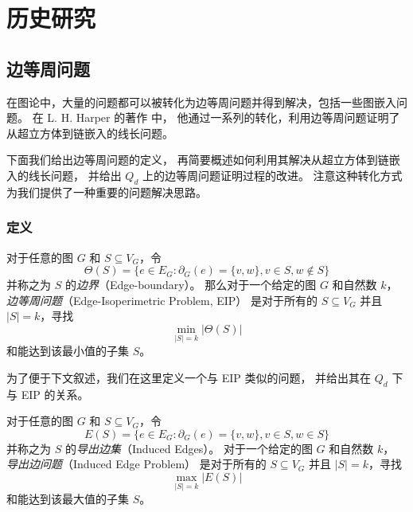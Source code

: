 
\chapter{历史研究}
\label{Chapter 3}

\section{边等周问题}
\label{Section 3.1}

在图论中，大量的问题都可以被转化为边等周问题并得到解决，包括一些图嵌入问题。
在 L. H. Harper 的著作 \cite{Harper.1964,Harper.2004} 中，
他通过一系列的转化，利用边等周问题证明了从超立方体到链嵌入的线长问题。

下面我们给出边等周问题的定义，
再简要概述如何利用其解决从超立方体到链嵌入的线长问题，
并给出 $Q_d$ 上的边等周问题证明过程的改进。
注意这种转化方式为我们提供了一种重要的问题解决思路。

\subsection{定义}
\label{Subsection 3.1.1}

对于任意的图 $G$ 和 $S \subseteq V_G$，令
\begin{equation*}
\Theta(S) = \{e \in E_G \colon \partial_G(e) = \{v, w\}, v \in S, w \notin S\}
\end{equation*}
并称之为 $S$ 的\emph{边界}（Edge-boundary）。
那么对于一个给定的图 $G$ 和自然数 $k$，
\emph{边等周问题}（Edge-Isoperimetric Problem, EIP）
是对于所有的 $S \subseteq V_G$ 并且 $|S| = k$，寻找
\begin{equation*}
\min_{|S| = k} |\Theta(S)|
\end{equation*}
和能达到该最小值的子集 $S$。

为了便于下文叙述，我们在这里定义一个与 EIP 类似的问题，
并给出其在 $Q_d$ 下与 EIP 的关系。

对于任意的图 $G$ 和 $S \subseteq V_G$，令
\begin{equation*}
E(S) = \{e \in E_G \colon \partial_G(e) = \{v, w\}, v \in S, w \in S\}
\end{equation*}
并称之为 $S$ 的\emph{导出边集}（Induced Edges）。
对于一个给定的图 $G$ 和自然数 $k$，
\emph{导出边问题}（Induced Edge Problem）
是对于所有的 $S \subseteq V_G$ 并且 $|S| = k$，寻找
\begin{equation*}
\max_{|S| = k} |E(S)|
\end{equation*}
和能达到该最大值的子集 $S$。

